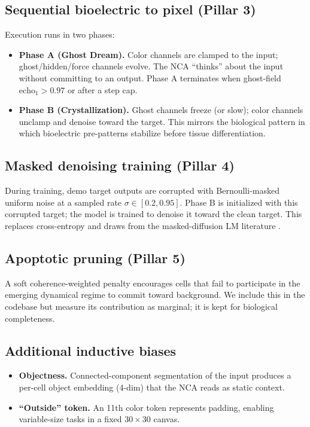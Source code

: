 \documentclass[11pt]{article}
\begin{document}
\subsection{Sequential bioelectric to pixel (Pillar 3)}

Execution runs in two phases:
\begin{itemize}
    \item \textbf{Phase A (Ghost Dream).} Color channels are clamped to the input; ghost/hidden/force channels evolve. The NCA ``thinks'' about the input without committing to an output. Phase A terminates when ghost-field $\mathrm{echo}_1 > 0.97$ or after a step cap.
    \item \textbf{Phase B (Crystallization).} Ghost channels freeze (or slow); color channels unclamp and denoise toward the target. This mirrors the biological pattern in which bioelectric pre-patterns \citep{levin2014molecular} stabilize before tissue differentiation.
\end{itemize}

\subsection{Masked denoising training (Pillar 4)}

During training, demo target outputs are corrupted with Bernoulli-masked uniform noise at a sampled rate $\sigma \in [0.2, 0.95]$. Phase B is initialized with this corrupted target; the model is trained to denoise it toward the clean target. This replaces cross-entropy and draws from the masked-diffusion LM literature \citep{architects2025}.

\subsection{Apoptotic pruning (Pillar 5)}

A soft coherence-weighted penalty encourages cells that fail to participate in the emerging dynamical regime to commit toward background. We include this in the codebase but measure its contribution as marginal; it is kept for biological completeness.

\subsection{Additional inductive biases}

\begin{itemize}
    \item \textbf{Objectness.} Connected-component segmentation of the input produces a per-cell object embedding (4-dim) that the NCA reads as static context.
    \item \textbf{``Outside'' token.} An 11th color token represents padding, enabling variable-size tasks in a fixed $30 \times 30$ canvas.
\end{itemize}
\end{document}
